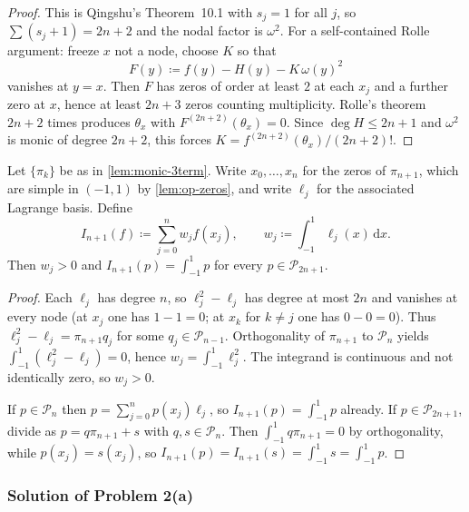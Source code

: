 \documentclass[11pt,a4paper]{article}
\begin{document}
\begin{proof}
This is Qingshu's Theorem~10.1 with \(s_{j}=1\) for all \(j\), so \(\sum(s_{j}+1)=2n+2\) and the nodal factor is \(\omega^{2}\). For a self-contained Rolle argument: freeze \(x\) not a node, choose \(K\) so that
\[
F(y)
\coloneqq
f(y)-H(y)-K\,\omega(y)^{2}
\]
vanishes at \(y=x\). Then \(F\) has zeros of order at least \(2\) at each \(x_{j}\) and a further zero at \(x\), hence at least \(2n+3\) zeros counting multiplicity. Rolle's theorem \(2n+2\) times produces \(\theta_{x}\) with \(F^{(2n+2)}(\theta_{x})=0\). Since \(\deg H\le 2n+1\) and \(\omega^{2}\) is monic of degree \(2n+2\), this forces \(K=f^{(2n+2)}(\theta_{x})/(2n+2)!\).
\end{proof}

\begin{lemma}
\label{lem:gauss-precision}
Let \(\{\pi_{k}\}\) be as in \cref{lem:monic-3term}. Write \(x_{0},\ldots,x_{n}\) for the zeros of \(\pi_{n+1}\), which are simple in \((-1,1)\) by \cref{lem:op-zeros}, and write \(\ell_{j}\) for the associated Lagrange basis. Define
\[
I_{n+1}(f)
\coloneqq
\sum_{j=0}^{n}w_{j}f(x_{j}),
\qquad
w_{j}
\coloneqq
\int_{-1}^{1}\ell_{j}(x)\,\mathrm{d}x.
\]
Then \(w_{j}>0\) and \(I_{n+1}(p)=\int_{-1}^{1}p\) for every \(p\in\mathcal{P}_{2n+1}\).
\end{lemma}

\begin{proof}
Each \(\ell_{j}\) has degree \(n\), so \(\ell_{j}^{2}-\ell_{j}\) has degree at most \(2n\) and vanishes at every node (at \(x_{j}\) one has \(1-1=0\); at \(x_{k}\) for \(k\neq j\) one has \(0-0=0\)). Thus \(\ell_{j}^{2}-\ell_{j}=\pi_{n+1}q_{j}\) for some \(q_{j}\in\mathcal{P}_{n-1}\). Orthogonality of \(\pi_{n+1}\) to \(\mathcal{P}_{n}\) yields \(\int_{-1}^{1}(\ell_{j}^{2}-\ell_{j})=0\), hence \(w_{j}=\int_{-1}^{1}\ell_{j}^{2}\). The integrand is continuous and not identically zero, so \(w_{j}>0\).

If \(p\in\mathcal{P}_{n}\) then \(p=\sum_{j=0}^{n}p(x_{j})\ell_{j}\), so \(I_{n+1}(p)=\int_{-1}^{1}p\) already. If \(p\in\mathcal{P}_{2n+1}\), divide as \(p=q\pi_{n+1}+s\) with \(q,s\in\mathcal{P}_{n}\). Then \(\int_{-1}^{1}q\pi_{n+1}=0\) by orthogonality, while \(p(x_{j})=s(x_{j})\), so \(I_{n+1}(p)=I_{n+1}(s)=\int_{-1}^{1}s=\int_{-1}^{1}p\).
\end{proof}

\subsubsection{Solution of Problem 2(a)}
\end{document}
